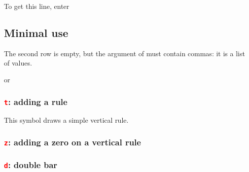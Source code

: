 To get this line, enter
\begin{tkzexample}
\end{tkzexample}


\subsection{Minimal use}
The second row is empty, but the argument of  must contain  commas: it is a list of  values.

\begin{tkzexample}
 \tkzTabLine{,,,,} or \tkzTabLine{ , , , , }\end{tkzexample}

\begin{tkzexample}[width=8cm,small]
\end{tkzexample}

\subsubsection{\texttt{\textcolor{red}{t}}: adding a rule}
This symbol draws a simple vertical rule.
\begin{tkzexample}[width=8cm,small]
\end{tkzexample}

\subsubsection{\texttt{\textcolor{red}{z}}: adding a zero on a vertical rule}
\begin{tkzexample}[width=8cm,small]
\end{tkzexample}

\subsubsection{\texttt{\textcolor{red}{d}}: double bar}

